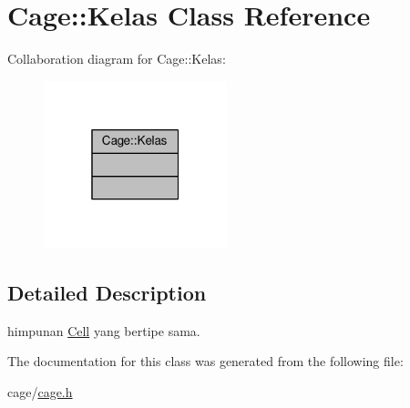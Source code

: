 \hypertarget{classCage_1_1Kelas}{}\section{Cage\+:\+:Kelas Class Reference}
\label{classCage_1_1Kelas}


Collaboration diagram for Cage\+:\+:Kelas\+:\nopagebreak
\begin{figure}[H]
\begin{center}
\leavevmode
\includegraphics[width=151pt]{classCage_1_1Kelas__coll__graph}
\end{center}
\end{figure}


\subsection{Detailed Description}
himpunan \hyperlink{classCell}{Cell} yang bertipe sama. 

The documentation for this class was generated from the following file\+:\begin{DoxyCompactItemize}
\item 
cage/\hyperlink{cage_8h}{cage.\+h}\end{DoxyCompactItemize}
